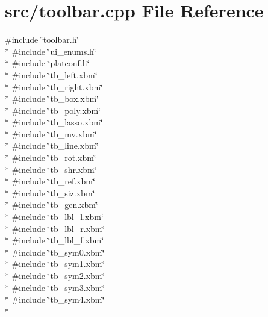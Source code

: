 \hypertarget{a00246}{\section{src/toolbar.cpp File Reference}
\label{a00246}
}
{\ttfamily \#include \char`\"{}toolbar.\-h\char`\"{}}\\*
{\ttfamily \#include \char`\"{}ui\-\_\-enums.\-h\char`\"{}}\\*
{\ttfamily \#include \char`\"{}platconf.\-h\char`\"{}}\\*
{\ttfamily \#include \char`\"{}tb\-\_\-left.\-xbm\char`\"{}}\\*
{\ttfamily \#include \char`\"{}tb\-\_\-right.\-xbm\char`\"{}}\\*
{\ttfamily \#include \char`\"{}tb\-\_\-box.\-xbm\char`\"{}}\\*
{\ttfamily \#include \char`\"{}tb\-\_\-poly.\-xbm\char`\"{}}\\*
{\ttfamily \#include \char`\"{}tb\-\_\-lasso.\-xbm\char`\"{}}\\*
{\ttfamily \#include \char`\"{}tb\-\_\-mv.\-xbm\char`\"{}}\\*
{\ttfamily \#include \char`\"{}tb\-\_\-line.\-xbm\char`\"{}}\\*
{\ttfamily \#include \char`\"{}tb\-\_\-rot.\-xbm\char`\"{}}\\*
{\ttfamily \#include \char`\"{}tb\-\_\-shr.\-xbm\char`\"{}}\\*
{\ttfamily \#include \char`\"{}tb\-\_\-ref.\-xbm\char`\"{}}\\*
{\ttfamily \#include \char`\"{}tb\-\_\-siz.\-xbm\char`\"{}}\\*
{\ttfamily \#include \char`\"{}tb\-\_\-gen.\-xbm\char`\"{}}\\*
{\ttfamily \#include \char`\"{}tb\-\_\-lbl\-\_\-l.\-xbm\char`\"{}}\\*
{\ttfamily \#include \char`\"{}tb\-\_\-lbl\-\_\-r.\-xbm\char`\"{}}\\*
{\ttfamily \#include \char`\"{}tb\-\_\-lbl\-\_\-f.\-xbm\char`\"{}}\\*
{\ttfamily \#include \char`\"{}tb\-\_\-sym0.\-xbm\char`\"{}}\\*
{\ttfamily \#include \char`\"{}tb\-\_\-sym1.\-xbm\char`\"{}}\\*
{\ttfamily \#include \char`\"{}tb\-\_\-sym2.\-xbm\char`\"{}}\\*
{\ttfamily \#include \char`\"{}tb\-\_\-sym3.\-xbm\char`\"{}}\\*
{\ttfamily \#include \char`\"{}tb\-\_\-sym4.\-xbm\char`\"{}}\\*
